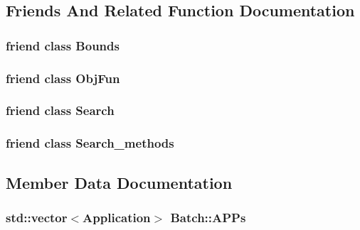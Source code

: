 \subsection{Friends And Related Function Documentation}
\hypertarget{classBatch_ac174a08cdaebb01dfd90673034f10fab}{
\subsubsection[{Bounds}]{\setlength{\rightskip}{0pt plus 5cm}friend class {\bf Bounds}\hspace{0.3cm}{\ttfamily [friend]}}}\label{classBatch_ac174a08cdaebb01dfd90673034f10fab}
\hypertarget{classBatch_ab332b708060d79472caf1a215fe8b6a9}{
\subsubsection[{Obj\-Fun}]{\setlength{\rightskip}{0pt plus 5cm}friend class {\bf Obj\-Fun}\hspace{0.3cm}{\ttfamily [friend]}}}\label{classBatch_ab332b708060d79472caf1a215fe8b6a9}
\hypertarget{classBatch_aea88561fddd2e924cebf793f0cfdc8b6}{
\subsubsection[{Search}]{\setlength{\rightskip}{0pt plus 5cm}friend class Search\hspace{0.3cm}{\ttfamily [friend]}}}\label{classBatch_aea88561fddd2e924cebf793f0cfdc8b6}
\hypertarget{classBatch_a03f712db503340b39afba2ca88462f1d}{
\subsubsection[{Search\-\_\-methods}]{\setlength{\rightskip}{0pt plus 5cm}friend class {\bf Search\-\_\-methods}\hspace{0.3cm}{\ttfamily [friend]}}}\label{classBatch_a03f712db503340b39afba2ca88462f1d}


\subsection{Member Data Documentation}
\hypertarget{classBatch_a757bf1a36fee46b1b47263ab4a59c560}{
\subsubsection[{A\-P\-Ps}]{\setlength{\rightskip}{0pt plus 5cm}std\-::vector$<${\bf Application}$>$ Batch\-::\-A\-P\-Ps\hspace{0.3cm}{\ttfamily [private]}}}\label{classBatch_a757bf1a36fee46b1b47263ab4a59c560}


